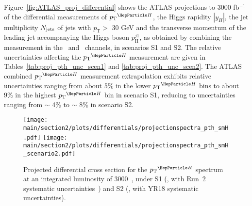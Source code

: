 Figure~\ref{fig:ATLAS_proj_differential} shows the ATLAS projections to 3000 fb$^{-1}$ of the differential measurements of $\pTH$, the Higgs rapidity $|y_H|$, the jet multiplicity $N_{\rm jets}$ of jets with $p_{\mathrm{T}} >$ 30 GeV and the transverse momentum of the leading jet accompanying the Higgs boson $p_{\mathrm{H}}^{j1}$, as obtained by combining the measurement in the \Hyy\ and \HZZ\ channels, in scenarios S1 and S2. The relative uncertainties affecting the $\pTH$ measurement are given in Tables~\ref{tab:proj_pth_unc_scen1} and \ref{tab:proj_pth_unc_scen2}.
The ATLAS combined $\pTH$ measurement extrapolation exhibits relative uncertainties ranging from about 5\% in the lower $\pTH$ bins to about 9\% in the highest $\pTH$ bin in scenario S1, reducing to uncertainties ranging from $\sim$ 4\% to $\sim$ 8\% in scenario S2.

\begin{figure}%
  \begin{center}
    \texttt{[image: \\main/section2/plots/differentials/projectionspectra\_pth\_smH.pdf]}
    \texttt{[image: \\main/section2/plots/differentials/projectionspectra\_pth\_smH\_scenario2.pdf]}
    \caption{
        Projected differential cross section for the $\pTH$ spectrum at an integrated luminosity of 3000\fbinv ~\cite{CMS-PAS-FTR-18-011}, under S1 (\UcmsLeft, with Run~2 systematic uncertainties~\cite{CMS-PAS-HIG-17-028}) and S2 (\UcmsRight, with YR18 systematic uncertainties).
        }
    \label{fig:proj_pth}
  \end{center}
\end{figure}


